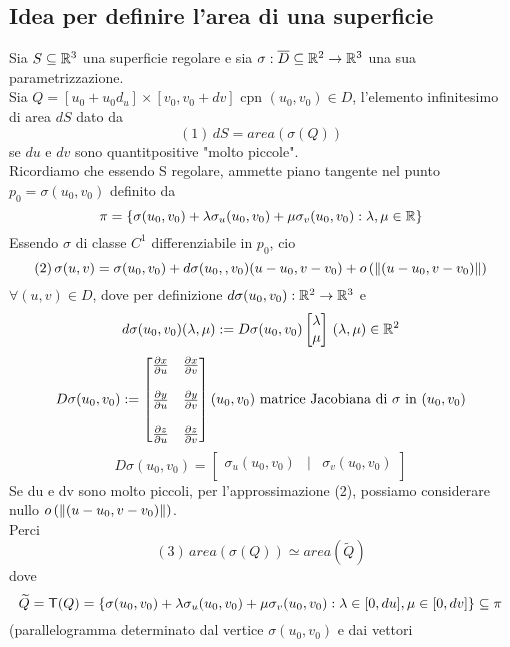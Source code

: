 \subsection{Idea per definire l'area di una superficie}
Sia $S\subseteq\mathbb{R}^3$ una superficie regolare e sia 
$\sigma:\overline{D}\subseteq \mathbb{R}^2\to\mathbb{R}^3$ una sua parametrizzazione. \\
Sia $Q = [u_0+u_0d_u]\times[v_0,v_0+dv]$ cpn $(u_0,v_0)\in D$, l'elemento 
infinitesimo di area $dS$ \ace dato da 
$$(1)\, dS = area(\sigma(Q))$$
se $du$ e $dv$ sono quantit\aca positive "molto piccole". \\
Ricordiamo che essendo S regolare, ammette piano tangente nel punto $p_0 = \sigma(u_0,v_0)$ 
definito da 
$$\pi = \{\sigma(u_0,v_0) + \lambda\sigma_u(u_0,v_0) + \mu\sigma_v(u_0,v_0):\lambda,\mu\in\mathbb{R}\}$$
Essendo $\sigma$ di classe $C^1$ \ace differenziabile in $p_0$, cio\ace 
$$(2) \, \sigma(u,v) = \sigma(u_0,v_0)+d\sigma(u_0,,v_0)(u-u_0,v-v_0)+ o\left(\left\lVert(u-u_0,v-v_0)\right\rVert\right) $$
$\forall (u,v)\in D$, dove per definizione 
$d\sigma(u_0,v_0) : \mathbb{R}^2\to\mathbb{R}^3$ e 
$$d\sigma(u_0,v_0)(\lambda,\mu) := D\sigma(u_0,v_0)\begin{bmatrix}
  \lambda \\
  \mu \\
\end{bmatrix} \, (\lambda,\mu)\in\mathbb{R}^2$$
$$D\sigma(u_0,v_0):= \begin{bmatrix}
  \frac{\partial x}{\partial u} & \frac{\partial x}{\partial v} \\
  \\
  \frac{\partial y}{\partial u} & \frac{\partial y}{\partial v} \\
  \\
  \frac{\partial z}{\partial u} & \frac{\partial z}{\partial v} \\
\end{bmatrix}(u_0,v_0) \text{ matrice Jacobiana di } \sigma \text{ in } (u_0,v_0)$$
$$D\sigma(u_0,v_0) = \begin{bmatrix}
  \sigma_u(u_0,v_0) & | & \sigma_v(u_0,v_0) \\
\end{bmatrix}$$
Se du e dv sono molto piccoli, per l'approssimazione (2), possiamo considerare nullo 
$o\left(\left\lVert(u-u_0,v-v_0)\right\rVert\right)$. \\
Perci\aco $$(3) \, area(\sigma(Q)) \simeq area(\widetilde{Q})$$
dove 
$$\widetilde{Q} = \mathsf{T}(Q) = \{\sigma(u_0,v_0) + \lambda\sigma_u(u_0,v_0) + \mu\sigma_v(u_0,v_0): \lambda\in[0,du],
  \mu \in [0,dv]\} \subseteq \pi$$
(parallelogramma determinato dal vertice $\sigma(u_0,v_0)$ e dai vettori 
